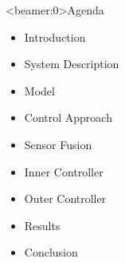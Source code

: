 \begin{frame}<beamer:0>{Agenda}{}
    \begin{itemize}
        \item Introduction
        \item System Description
        \item Model
        \item Control Approach
        \item Sensor Fusion
        \item Inner Controller
        \item Outer Controller
        \item Results
        \item Conclusion
    \end{itemize}
\end{frame}